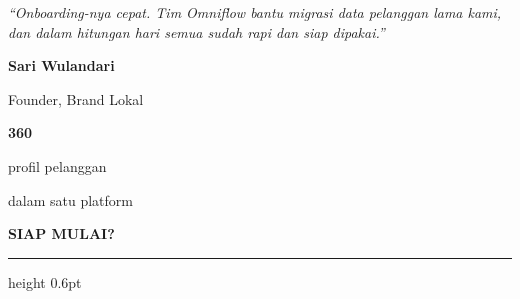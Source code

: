 \documentclass[a4paper]{article}
\newcommand{\sectiontitle}[1]{%
    \vspace{10pt}%
    {\fontsize{13}{16}\selectfont\bfseries\color{BlueDark} #1}\par\vspace{3pt}%
    {\color{BluePrimary}\hrule height 0.6pt}\par\vspace{8pt}%
}
\begin{document}
\noindent
\begin{minipage}[t]{0.485\textwidth}
    \colorbox{BlueBg}{%
        \begin{minipage}{\dimexpr\linewidth-2\fboxsep\relax}
            {\fontsize{9.5}{13}\selectfont\color{TextDark}\textit{``Onboarding-nya cepat. Tim Omniflow bantu migrasi data pelanggan lama kami, dan dalam hitungan hari semua sudah rapi dan siap dipakai.''}}\par\vspace{4pt}
            {\fontsize{8.5}{11}\selectfont\bfseries\color{BluePrimary} Sari Wulandari}\par
            {\fontsize{8}{10}\selectfont\color{TextLight} Founder, Brand Lokal}
        \end{minipage}}
\end{minipage}%
\hfill
\begin{minipage}[t]{0.485\textwidth}
    \colorbox{BlueBg}{%
        \begin{minipage}{\dimexpr\linewidth-2\fboxsep\relax}
            \begin{center}
                {\fontsize{20}{24}\selectfont\bfseries\color{BluePrimary} 360\textdegree{}}\par
                {\fontsize{9.5}{12}\selectfont\color{TextDark} profil pelanggan}\par
                {\fontsize{9.5}{12}\selectfont\color{TextDark} dalam satu platform}
            \end{center}
        \end{minipage}}
\end{minipage}

\sectiontitle{SIAP MULAI?}
\end{document}
